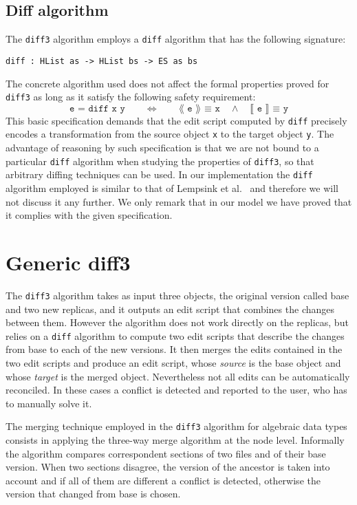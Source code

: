 \documentclass[preprint]{sigplanconf}
\begin{document}
	\subsection{Diff algorithm}
	The \texttt{diff3} algorithm employs a \texttt{diff} algorithm that has the 
	following	signature:
\begin{verbatim}
diff : HList as -> HList bs -> ES as bs
\end{verbatim}
	The concrete algorithm used does not affect the formal properties 
	proved for \texttt{diff3} as long as it satisfy the following safety 
	requirement:
\[ \texttt{e = diff x y} \qquad \Leftrightarrow \qquad \texttt{⟪ e ⟫ ≡ x} \quad \land \quad  \texttt{⟦ e ⟧ ≡ y} \]
	This basic specification demands that the edit script computed by 
	\texttt{diff} precisely encodes a transformation from the source object 
	\texttt{x} to the target object \texttt{y}.
	The advantage of reasoning by such specification is that we are not bound
	to a particular \texttt{diff} algorithm when studying the properties of 
	\texttt{diff3}, so that arbitrary diffing techniques can be used.
	In our implementation the \texttt{diff} algorithm employed is similar
	to that of Lempsink et al.\ \cite{Lemp09} and therefore we will not discuss
	it any further. We only remark that in our model we have proved that it 
	complies with the given specification.
	
\section{Generic diff3}
	The \texttt{diff3} algorithm takes as input three objects, the original
	version called base and two new replicas, and it outputs an
	edit script that combines the changes between them.
	However the algorithm does not work directly on the replicas, but relies
	on a \texttt{diff} algorithm to compute two edit scripts that describe
	the changes from base to each of the new versions.
	It then merges the edits contained in the two edit scripts and produce
	an edit script, whose \emph{source} is the base object and whose 
	\emph{target} is the merged object.
	Nevertheless not all edits can be automatically reconciled.
	In these cases a conflict is detected and reported to the user, who has
	to manually solve it.
		
	The merging technique employed in the \texttt{diff3} algorithm for
	algebraic data types consists in applying the three-way merge algorithm
	at the node level. 
	Informally the algorithm compares correspondent sections 
	of two files and of their base version.
	When two sections disagree, the version of the ancestor
	is taken into account and if all of them are different a conflict is detected,
	otherwise the version that changed from base is chosen.
	
\end{document}
